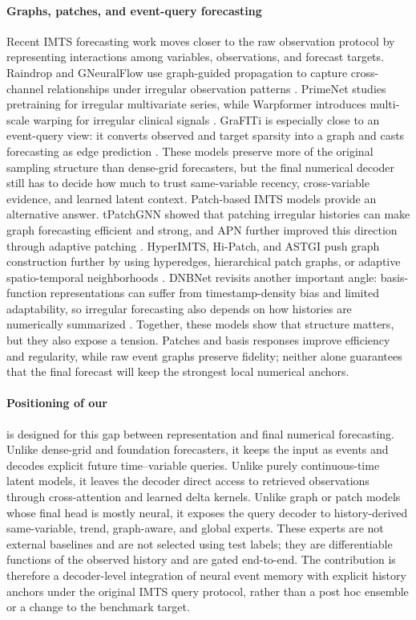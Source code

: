 \documentclass[preprint,12pt]{elsarticle}
\begin{document}
\paragraph{Graphs, patches, and event-query forecasting}
Recent IMTS forecasting work moves closer to the raw observation protocol by
representing interactions among variables, observations, and forecast targets.
Raindrop and GNeuralFlow use graph-guided propagation to capture cross-channel
relationships under irregular observation patterns \citep{raindrop2,gneuralflow}.
PrimeNet studies pretraining for irregular multivariate series, while
Warpformer introduces multi-scale warping for irregular clinical signals
\citep{primenet,warpformer}. GraFITi is especially close to an event-query view:
it converts observed and target sparsity into a graph and casts forecasting as
edge prediction \citep{grafiti}. These models preserve more of the original
sampling structure than dense-grid forecasters, but the final numerical decoder
still has to decide how much to trust same-variable recency, cross-variable
evidence, and learned latent context. Patch-based IMTS models provide an alternative answer. tPatchGNN showed that
patching irregular histories can make graph forecasting efficient and strong,
and APN further improved this direction through adaptive patching
\citep{tPatchGNN,apn}. HyperIMTS, Hi-Patch, and ASTGI push graph construction
further by using hyperedges, hierarchical patch graphs, or adaptive
spatio-temporal neighborhoods \citep{HyperIMTS2025,HiPatch2025,ASTGI2026}.
DNBNet revisits another important angle: basis-function representations can
suffer from timestamp-density bias and limited adaptability, so irregular
forecasting also depends on how histories are numerically summarized
\citep{DNBNet2026}. Together, these models show that structure matters, but
they also expose a tension. Patches and basis responses improve efficiency and
regularity, while raw event graphs preserve fidelity; neither alone guarantees
that the final forecast will keep the strongest local numerical anchors.

\paragraph{Positioning of our \method{}}
\method{} is designed for this gap between representation and final numerical
forecasting. Unlike dense-grid and foundation forecasters, it keeps the input as
events and decodes explicit future time--variable queries. Unlike purely
continuous-time latent models, it leaves the decoder direct access to retrieved
observations through cross-attention and learned delta kernels. Unlike graph or
patch models whose final head is mostly neural, it exposes the query decoder to
history-derived same-variable, trend, graph-aware, and global experts. These
experts are not external baselines and are not selected using test labels; they
are differentiable functions of the observed history and are gated end-to-end.
The contribution is therefore a decoder-level integration of neural event
memory with explicit history anchors under the original IMTS query protocol,
rather than a post hoc ensemble or a change to the benchmark target.
\end{document}
